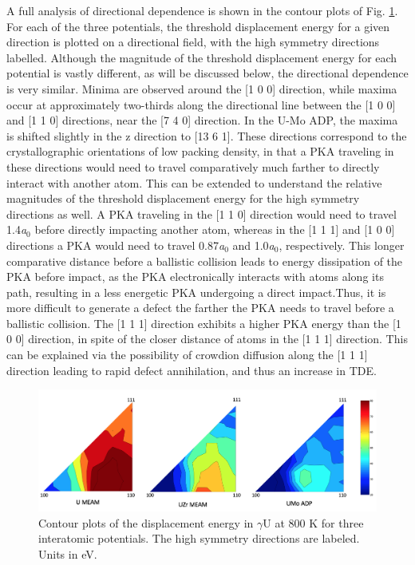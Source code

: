 \documentclass[review]{elsarticle}
\begin{document}
\FloatBarrier

A full analysis of directional dependence is shown in the contour plots of Fig. \ref{fig:800Kcontour}. For each of the three potentials, the threshold displacement energy for a given direction is plotted on a directional field, with the high symmetry directions labelled. Although the magnitude of the threshold displacement energy for each potential is vastly different, as will be discussed below, the directional dependence is very similar. Minima are observed around the [1 0 0] direction, while maxima occur at approximately two-thirds along the directional line between the [1 0 0] and [1 1 0] directions, near the [7 4 0] direction. In the U-Mo ADP, the maxima is shifted slightly in the z direction to [13 6 1]. These directions correspond to the crystallographic orientations of low packing density, in that a PKA traveling in these directions would need to travel comparatively much farther to directly interact with another atom. This can be extended to understand the relative magnitudes of the threshold displacement energy for the high symmetry directions as well. A PKA traveling in the [1 1 0] direction would need to travel 1.4\textit{a$_{0}$} before directly impacting another atom, whereas in the [1 1 1] and [1 0 0] directions a PKA would need to travel 0.87\textit{a$_{0}$} and 1.0\textit{a$_{0}$}, respectively. This longer comparative distance before a ballistic collision leads to energy dissipation of the PKA before impact, as the PKA electronically interacts with atoms along its path, resulting in a less energetic PKA undergoing a direct impact.Thus, it is more difficult to generate a defect the farther the PKA needs to travel before a ballistic collision. The [1 1 1] direction exhibits a higher PKA energy than the [1 0 0] direction, in spite of the closer distance of atoms in the [1 1 1] direction. This can be explained via the possibility of crowdion diffusion along the [1 1 1] direction leading to rapid defect annihilation, and thus an increase in TDE. 

\begin{figure}[h]
 \centering
 \includegraphics[width=\textwidth]{800K_contour.png} 
 \caption{Contour plots of the displacement energy in $\gamma$U at 800 K for three interatomic potentials. The high symmetry directions are labeled. Units in eV.}
 \label{fig:800Kcontour}
\end{figure}
\end{document}
